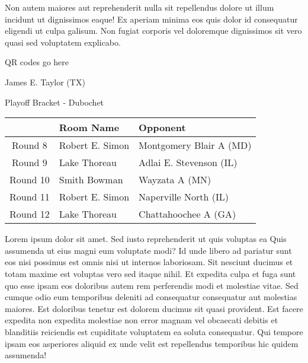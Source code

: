 \documentclass{article}%
\begin{document}
\newline%
Non autem maiores aut reprehenderit nulla sit repellendus dolore ut illum incidunt ut dignissimos eaque! Ex aperiam minima eos quis dolor id consequatur eligendi ut culpa galisum. Non fugiat corporis vel doloremque dignissimos sit vero quasi sed voluptatem explicabo.\newline%
\newline%
%
\vspace*{30pt}%
\begin{center}%
\begin{Huge}%
QR codes go here%
\end{Huge}%
\end{center}%
\newpage%
\begin{center}%
\begin{Huge}%
James E. Taylor (TX)%
\end{Huge}%
\vspace*{8pt}%
\linebreak%
\begin{Large}%
Playoff Bracket {-} Dubochet%
\end{Large}%
\end{center}%
\begin{tabularx}{\textwidth}{|c|Y|Y|}%
\hline%
&Room Name&Opponent\\%
\hline%
Round 8&Robert E. Simon&Montgomery Blair A (MD)\\%
Round 9&Lake Thoreau&Adlai E. Stevenson (IL)\\%
Round 10&Smith Bowman&Wayzata A (MN)\\%
Round 11&Robert E. Simon&Naperville North (IL)\\%
Round 12&Lake Thoreau&Chattahoochee A (GA)\\%
\hline%
\end{tabularx}%
\vspace*{8pt}%
\linebreak%
\newline%
\newline%
Lorem ipsum dolor sit amet. Sed iusto reprehenderit ut quis voluptas ea Quis assumenda ut eius magni eum voluptate modi? Id unde libero ad pariatur sunt eos nisi possimus est omnis nisi ut internos laboriosam. Sit nesciunt ducimus et totam maxime est voluptas vero sed itaque nihil. Et expedita culpa et fuga sunt quo esse ipsam eos doloribus autem rem perferendis modi et molestiae vitae.\newline%
\newline%
Sed cumque odio eum temporibus deleniti ad consequatur consequatur aut molestias maiores. Est doloribus tenetur est dolorem ducimus sit quasi provident. Est facere expedita non expedita molestiae non error magnam vel obcaecati debitis et blanditiis reiciendis est cupiditate voluptatem ea soluta consequatur. Qui tempore ipsam eos asperiores aliquid ex unde velit est repellendus temporibus hic quidem assumenda!\newline%
\end{document}
